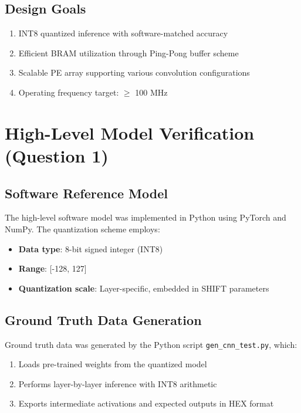 \documentclass[11pt,a4paper]{article}
\begin{document}
\subsection{Design Goals}
\begin{enumerate}
    \item INT8 quantized inference with software-matched accuracy
    \item Efficient BRAM utilization through Ping-Pong buffer scheme
    \item Scalable PE array supporting various convolution configurations
    \item Operating frequency target: $\ge$ 100 MHz
\end{enumerate}

\section{High-Level Model Verification (Question 1)}

\subsection{Software Reference Model}
The high-level software model was implemented in Python using PyTorch and NumPy. The quantization scheme employs:
\begin{itemize}
    \item \textbf{Data type}: 8-bit signed integer (INT8)
    \item \textbf{Range}: [-128, 127]
    \item \textbf{Quantization scale}: Layer-specific, embedded in SHIFT parameters
\end{itemize}

\subsection{Ground Truth Data Generation}
Ground truth data was generated by the Python script \texttt{gen\_cnn\_test.py}, which:
\begin{enumerate}
    \item Loads pre-trained weights from the quantized model
    \item Performs layer-by-layer inference with INT8 arithmetic
    \item Exports intermediate activations and expected outputs in HEX format
\end{enumerate}
\end{document}
